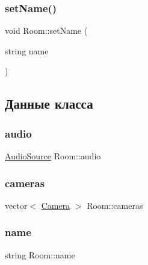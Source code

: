 \subsubsection{\texorpdfstring{set\+Name()}{setName()}\hspace{0.1cm}{\footnotesize\ttfamily [2/2]}}
{\footnotesize\ttfamily void Room\+::set\+Name (\begin{DoxyParamCaption}\item[{string}]{name }\end{DoxyParamCaption})\hspace{0.3cm}{\ttfamily [inline]}}



\subsection{Данные класса}
\mbox{\label{class_room_a09874479cea41dde79c7c8dfdbd1703c}} 
\subsubsection{\texorpdfstring{audio}{audio}}
{\footnotesize\ttfamily \hyperlink{struct_audio_source}{Audio\+Source} Room\+::audio\hspace{0.3cm}{\ttfamily [private]}}

\mbox{\label{class_room_a3e2ec3339b74eccacc2946d42151efc1}} 
\subsubsection{\texorpdfstring{cameras}{cameras}}
{\footnotesize\ttfamily vector$<$ \hyperlink{struct_camera}{Camera} $>$ Room\+::cameras\hspace{0.3cm}{\ttfamily [private]}}

\mbox{\label{class_room_ae75204d685fe893bf4c867f9f3a79eb3}} 
\subsubsection{\texorpdfstring{name}{name}}
{\footnotesize\ttfamily string Room\+::name\hspace{0.3cm}{\ttfamily [private]}}

